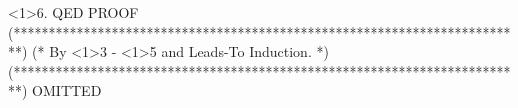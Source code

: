 \documentclass[fleqn,leqno]{article}
\begin{document}
\begin{verbatim*}
<1>6. QED                                                                     PROOF
  (*************************************************************************)
  (* By <1>3 - <1>5 and Leads-To Induction.                                *)
  (*************************************************************************) OMITTED
\end{verbatim*}
\end{document}
